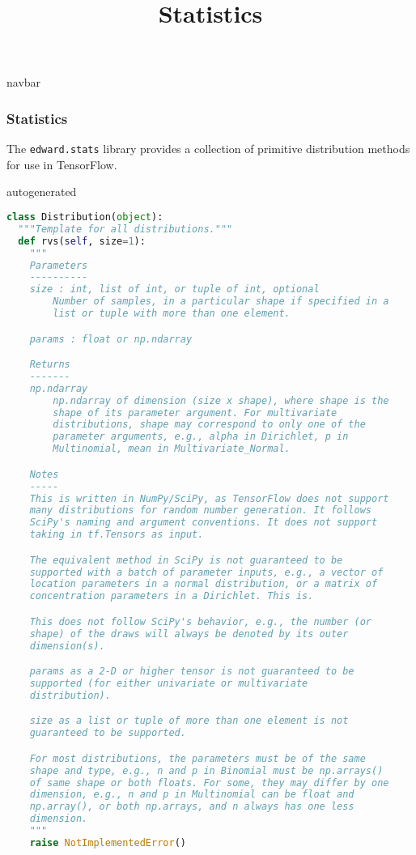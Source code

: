 \title{Statistics}

{{navbar}}

\subsubsection{Statistics}

The \texttt{edward.stats} library provides a collection of primitive
distribution methods for use in TensorFlow.

{{autogenerated}}

\begin{lstlisting}[language=Python]
class Distribution(object):
  """Template for all distributions."""
  def rvs(self, size=1):
    """
    Parameters
    ----------
    size : int, list of int, or tuple of int, optional
        Number of samples, in a particular shape if specified in a
        list or tuple with more than one element.

    params : float or np.ndarray

    Returns
    -------
    np.ndarray
        np.ndarray of dimension (size x shape), where shape is the
        shape of its parameter argument. For multivariate
        distributions, shape may correspond to only one of the
        parameter arguments, e.g., alpha in Dirichlet, p in
        Multinomial, mean in Multivariate_Normal.

    Notes
    -----
    This is written in NumPy/SciPy, as TensorFlow does not support
    many distributions for random number generation. It follows
    SciPy's naming and argument conventions. It does not support
    taking in tf.Tensors as input.

    The equivalent method in SciPy is not guaranteed to be
    supported with a batch of parameter inputs, e.g., a vector of
    location parameters in a normal distribution, or a matrix of
    concentration parameters in a Dirichlet. This is.

    This does not follow SciPy's behavior, e.g., the number (or
    shape) of the draws will always be denoted by its outer
    dimension(s).

    params as a 2-D or higher tensor is not guaranteed to be
    supported (for either univariate or multivariate
    distribution).

    size as a list or tuple of more than one element is not
    guaranteed to be supported.

    For most distributions, the parameters must be of the same
    shape and type, e.g., n and p in Binomial must be np.arrays()
    of same shape or both floats. For some, they may differ by one
    dimension, e.g., n and p in Multinomial can be float and
    np.array(), or both np.arrays, and n always has one less
    dimension.
    """
    raise NotImplementedError()
\end{lstlisting}
